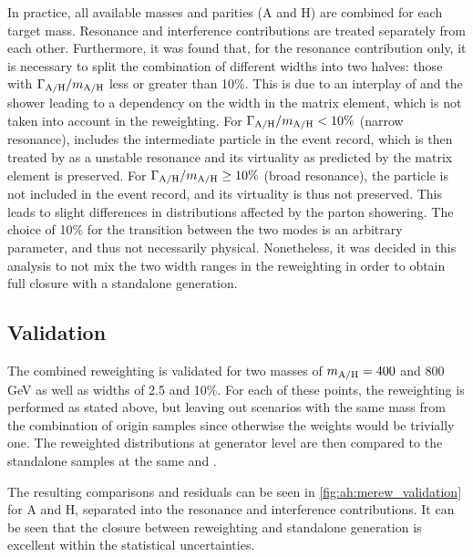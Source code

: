 In practice, all available masses and parities (A and H) are combined for each target \AH mass. Resonance and interference contributions are treated separately from each other. Furthermore, it was found that, for the resonance contribution only, it is necessary to split the combination of different \AH widths into two halves: those with $\Gamma_{\mathrm{A/H}}/m_{\mathrm{A/H}}$ less or greater than 10\%. This is due to an interplay of \amcatnlo and the \pythia shower leading to a dependency on the \AH width in the matrix element, which is not taken into account in the reweighting. For $\Gamma_{\mathrm{A/H}}/m_{\mathrm{A/H}} < 10\%$ (narrow resonance), \amcatnlo includes the intermediate \AH particle in the event record, which is then treated by \pythia as a unstable resonance and its virtuality as predicted by the matrix element is preserved. For $\Gamma_{\mathrm{A/H}}/m_{\mathrm{A/H}} \geq 10\%$ (broad resonance), the \AH particle is not included in the event record, and its virtuality is thus not preserved. This leads to slight differences in distributions affected by the parton showering. The choice of 10\% for the transition between the two modes is an arbitrary parameter, and thus not necessarily physical. Nonetheless, it was decided in this analysis to not mix the two width ranges in the reweighting in order to obtain full closure with a standalone generation.

\subsection{Validation}

The combined reweighting is validated for two masses of $m_{\mathrm{A/H}} = 400$ and 800 GeV as well as widths of 2.5 and 10\%. For each of these points, the reweighting is performed as stated above, but leaving out \AH scenarios with the same mass from the combination of origin samples since otherwise the weights would be trivially one. The reweighted \mtt distributions at generator level are then compared to the standalone samples at the same \mAH and \wAH.

The resulting comparisons and residuals can be seen in \cref{fig:ah:merew_validation} for A and H, separated into the resonance and interference contributions. It can be seen that the closure between reweighting and standalone generation is excellent within the statistical uncertainties.

